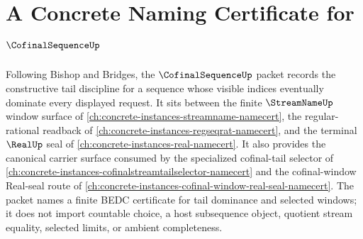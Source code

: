 \chapter{A Concrete Naming Certificate for $\CofinalSequenceUp$}
\label{ch:concrete-instances-cofinal-sequence-namecert}

Following Bishop and Bridges, the $\CofinalSequenceUp$ packet records the constructive tail discipline for a sequence whose visible indices eventually dominate every displayed request. It sits between the finite $\StreamNameUp$ window surface of \autoref{ch:concrete-instances-streamname-namecert}, the regular-rational readback of \autoref{ch:concrete-instances-regseqrat-namecert}, and the terminal $\RealUp$ seal of \autoref{ch:concrete-instances-real-namecert}. It also provides the canonical carrier surface consumed by the specialized cofinal-tail selector of \autoref{ch:concrete-instances-cofinalstreamtailselector-namecert} and the cofinal-window Real-seal route of \autoref{ch:concrete-instances-cofinal-window-real-seal-namecert}. The packet names a finite BEDC certificate for tail dominance and selected windows; it does not import countable choice, a host subsequence object, quotient stream equality, selected limits, or ambient completeness.

